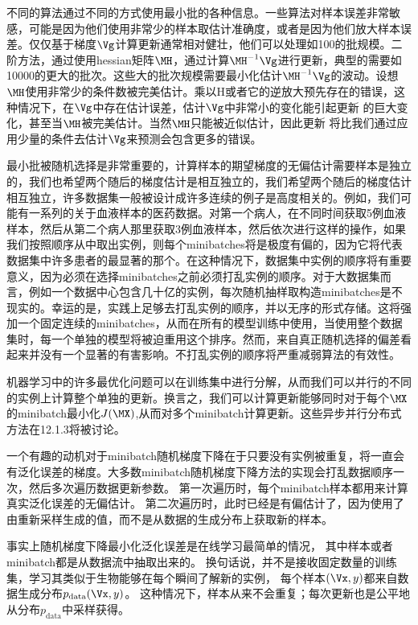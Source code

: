 不同的算法通过不同的方式使用最小批的各种信息。一些算法对样本误差非常敏感，可能是因为他们使用非常少的样本取估计准确度，或者是因为他们放大样本误差。仅仅基于梯度$\Vg$计算更新通常相对健壮，他们可以处理如100的批规模。二阶方法，通过使用\gls{hessian}矩阵$\MH$，通过计算$\MH^{-1}\Vg$进行更新，典型的需要如10000的更大的批次。这些大的批次规模需要最小化估计$\MH^{-1}\Vg$的波动。设想$\MH$使用非常少的条件数被完美估计。乘以H或者它的逆放大预先存在的错误，这种情况下，在$\Vg$中存在估计误差，估计$\Vg$中非常小的变化能引起更新 的巨大变化，甚至当$\MH$被完美估计。当然$\MH$只能被近似估计，因此更新 将比我们通过应用少量的条件去估计$\Vg$来预测会包含更多的错误。

最小批被随机选择是非常重要的，计算样本的期望梯度的无偏估计需要样本是独立的，我们也希望两个随后的梯度估计是相互独立的，我们希望两个随后的梯度估计相互独立，许多数据集一般被设计成许多连续的例子是高度相关的。例如，我们可能有一系列的关于血液样本的医药数据。对第一个病人，在不同时间获取5例血液样本，然后从第二个病人那里获取3例血液样本，然后依次进行这样的操作，如果我们按照顺序从中取出实例，则每个minibatches将是极度有偏的，因为它将代表数据集中许多患者的最显著的那个。在这种情况下，数据集中实例的顺序将有重要意义，因为必须在选择minibatches之前必须打乱实例的顺序。对于大数据集而言，例如一个数据中心包含几十亿的实例，每次随机抽样取构造minibatches是不现实的。幸运的是，实践上足够去打乱实例的顺序，并以无序的形式存储。这将强加一个固定连续的minibatches，从而在所有的模型训练中使用，当使用整个数据集时，每一个单独的模型将被迫重用这个排序。然而，来自真正随机选择的偏差看起来并没有一个显著的有害影响。不打乱实例的顺序将严重减弱算法的有效性。

机器学习中的许多最优化问题可以在训练集中进行分解，从而我们可以并行的不同的实例上计算整个单独的更新。换言之，我们可以计算更新能够同时对于每个$\MX$的minibatch最小化$J(\MX)$,从而对多个minibatch计算更新。这些异步并行分布式方法在12.1.3将被讨论。

一个有趣的动机对于minibatch随机梯度下降在于只要没有实例被重复，将一直会有泛化误差的梯度。大多数minibatch随机梯度下降方法的实现会打乱数据顺序一次，然后多次遍历数据更新参数。
第一次遍历时，每个minibatch样本都用来计算真实泛化误差的无偏估计。
第二次遍历时，此时已经是有偏估计了，因为使用了由重新采样生成的值，而不是从数据的生成分布上获取新的样本。

事实上随机梯度下降最小化泛化误差是在线学习最简单的情况，
其中样本或者minibatch都是从数据流中抽取出来的。
换句话说，并不是接收固定数量的训练集，学习其类似于生物能够在每个瞬间了解新的实例，
每个样本$(\Vx,y)$都来自数据生成分布$p_{\text{data}}(\Vx,y)$。
这种情况下，样本从来不会重复；每次更新也是公平地从分布$p_\text{data}$中采样获得。

